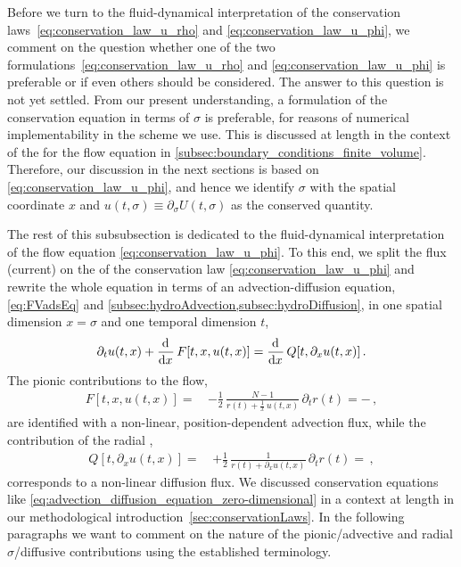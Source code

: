Before we turn to the fluid-dynamical interpretation of the conservation laws~\eqref{eq:conservation_law_u_rho} and \eqref{eq:conservation_law_u_phi}, we comment on the question whether one of the two formulations~\eqref{eq:conservation_law_u_rho} and \eqref{eq:conservation_law_u_phi} is preferable or if even others should be considered.
The answer to this question is not yet settled. 
From our present understanding, a formulation of the conservation equation in terms of $\sigma$ is preferable, for reasons of numerical implementability in the \fv{} scheme we use.
This is discussed at length in the context of the \pde{} \bcs{} for the \frg{} flow equation in \cref{subsec:boundary_conditions_finite_volume}.
Therefore, our discussion in the next sections is based on \cref{eq:conservation_law_u_phi}, and hence we identify $\sigma$ with the spatial coordinate $x$ and $u ( t, \sigma ) \equiv \partial_\sigma U ( t, \sigma )$ as the conserved quantity.\bigskip

The rest of this subsubsection is dedicated to the fluid-dynamical interpretation of the \frg{} flow equation \eqref{eq:conservation_law_u_phi}.
To this end, we split the flux (current) on the \rhs{} of the conservation law \eqref{eq:conservation_law_u_phi} and rewrite the whole equation in terms of an advection-diffusion equation, \cf{} \cref{eq:FVadsEq} and \cref{subsec:hydroAdvection,subsec:hydroDiffusion}, in one spatial dimension $x = \sigma$ and one temporal dimension $t$,
\begin{align}
	\partial_t u ( t, x ) + \dod{}{x} F [ t, x, u ( t, x ) ] = \dod{}{x} Q [ t, \partial_x u ( t, x ) ] \, .	\label{eq:advection_diffusion_equation_zero-dimensional}
\end{align}
The pionic contributions to the \frg{} flow,
\begin{align}
	F [ t, x, u ( t, x ) ] = \, & - \frac{1}{2} \, \frac{N - 1}{r ( t ) + \frac{1}{x} \, u ( t, x )}\, \partial_t r ( t ) = - \, ,\label{eq:advection_flux_pion_propagator}
\end{align}
are identified with a non-linear, position-dependent advection flux, while the contribution of the radial \sigmaMode{},
\begin{align}
	Q [ t, \partial_x u ( t, x ) ] = \, & + \frac{1}{2} \,  \frac{1}{r ( t ) + \partial_x u ( t, x )}\, \partial_t r ( t ) = \, ,\label{eq:diffusion_flux_sigma_propagator}
\end{align}
corresponds to a non-linear diffusion flux.
We discussed conservation equations like \cref{eq:advection_diffusion_equation_zero-dimensional} in a \cfd{} context at length in our methodological introduction~\ref{sec:conservationLaws}.
In the following paragraphs we want to comment on the nature of the pionic/advective and radial $\sigma$/diffusive contributions using the established \cfd{} terminology.

